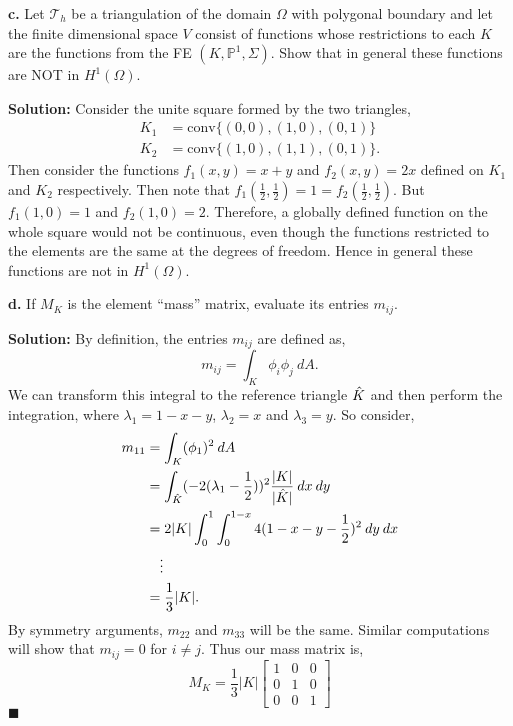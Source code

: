 \documentclass[11pt]{article}
\begin{document}
\vskip 2cm


\textbf{c.} Let $\mathcal{T}_h$ be a triangulation of the domain $\Omega$ with polygonal boundary and let the finite dimensional space $V$ consist of functions whose restrictions to each $K$ are the functions from the FE $(K,\mathbb{P}^1,\Sigma)$.
Show that in general these functions are NOT in $H^1(\Omega)$.


\vskip 1cm


\textbf{Solution:} Consider the unite square formed by the two triangles,
\begin{align*}
    K_1 &= \text{conv}\{(0,0), (1,0), (0,1)\} \\
    K_2 &= \text{conv} \{ (1,0), (1,1), (0,1)\}.
\end{align*}
Then consider the functions $f_1(x,y) = x + y$ and $f_2(x,y) = 2x$ defined on $K_1$ and $K_2$ respectively.
Then note that $f_1(\frac{1}{2}, \frac{1}{2}) = 1 = f_2(\frac{1}{2}, \frac{1}{2})$.
But $f_1(1,0) = 1$ and $f_2(1,0) = 2$.
Therefore, a globally defined function on the whole square would not be continuous, even though the functions restricted to the elements are the same at the degrees of freedom.
Hence in general these functions are not in $H^1(\Omega)$.


\vskip 2cm


\textbf{d.}  If $M_K$ is the element “mass” matrix, evaluate its entries $m_{ij}$.


\vskip 1cm


\textbf{Solution:} By definition, the entries $m_{ij}$ are defined as,
\begin{equation*}
    m_{ij} = \int_{K} \phi_i \phi_j \: dA.
\end{equation*}
We can transform this integral to the reference triangle $\Hat{K}$ and then perform the integration, where $\lambda_1 = 1 - x - y$, $\lambda_2 = x$ and $\lambda_3 = y$. 
So consider,
\begin{align*}
    m_{11} &= \int_{K} (\phi_1)^2 \: dA \\
    &= \int_{\Hat{K}} (-2(\lambda_1 - \frac{1}{2}))^2 \frac{|K|}{|\Hat{K}|} \: dx \: dy \\
    &= 2|K| \int_0^1 \int_0^{1-x} 4(1 - x - y - \frac{1}{2})^2 \: dy \: dx \\
    &\quad \vdots \\
    &= \frac{1}{3}|K|.
\end{align*}
By symmetry arguments, $m_{22}$ and $m_{33}$ will be the same.
Similar computations will show that $m_{ij} = 0$ for $i\neq j$. 
Thus our mass matrix is,
\begin{equation*}
    M_K = \frac{1}{3}|K| \begin{bmatrix} 
        1 & 0 & 0 \\
        0 & 1 & 0 \\
        0 & 0 & 1
    \end{bmatrix}
\end{equation*}
$\blacksquare$
\end{document}

